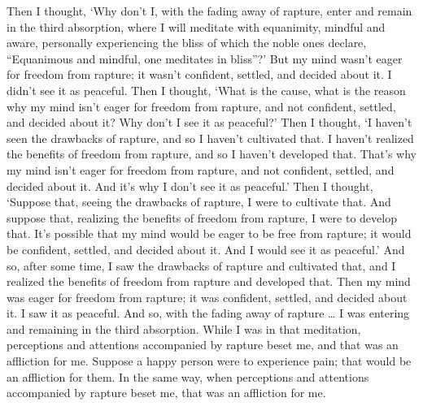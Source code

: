\documentclass[12pt,openany]{book}%
\begin{document}
Then I thought, ‘Why don’t I, with the fading away of rapture, enter and remain in the third absorption, where I will meditate with equanimity, mindful and aware, personally experiencing the bliss of which the noble ones declare, “Equanimous and mindful, one meditates in bliss”?’ But my mind wasn’t eager for freedom from rapture; it wasn’t confident, settled, and decided about it. I didn’t see it as peaceful. Then I thought, ‘What is the cause, what is the reason why my mind isn’t eager for freedom from rapture, and not confident, settled, and decided about it? Why don’t I see it as peaceful?’ Then I thought, ‘I haven’t seen the drawbacks of rapture, and so I haven’t cultivated that. I haven’t realized the benefits of freedom from rapture, and so I haven’t developed that. That’s why my mind isn’t eager for freedom from rapture, and not confident, settled, and decided about it. And it’s why I don’t see it as peaceful.’ Then I thought, ‘Suppose that, seeing the drawbacks of rapture, I were to cultivate that. And suppose that, realizing the benefits of freedom from rapture, I were to develop that. It’s possible that my mind would be eager to be free from rapture; it would be confident, settled, and decided about it. And I would see it as peaceful.’ And so, after some time, I saw the drawbacks of rapture and cultivated that, and I realized the benefits of freedom from rapture and developed that. Then my mind was eager for freedom from rapture; it was confident, settled, and decided about it. I saw it as peaceful. And so, with the fading away of rapture … I was entering and remaining in the third absorption. While I was in that meditation, perceptions and attentions accompanied by rapture beset me, and that was an affliction for me. Suppose a happy person were to experience pain; that would be an affliction for them. In the same way, when perceptions and attentions accompanied by rapture beset me, that was an affliction for me. 
\end{document}
